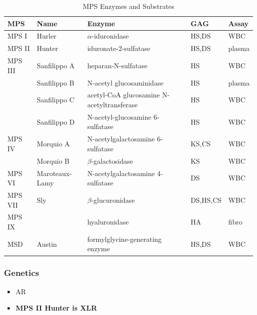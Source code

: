 \documentclass[12pt]{scrartcl}
\begin{document}
\begin{table}[htbp]
\caption[Mucopolysaccharidoses]{\label{tab:org027fa45}MPS Enzymes and Substrates}
\centering
\begin{tabular}{lllll}
MPS & Name & Enzyme & GAG & Assay\\
\hline
MPS I & Hurler & \(\alpha\)-iduronidase & HS,DS & WBC\\
\hline
MPS II & Hunter & iduronate-2-sulfatase & HS,DS & plasma\\
\hline
MPS III & Sanfilippo A & heparan-N-sulfatase & HS & WBC\\
 & Sanfilippo B & N-acetyl glucosaminidase & HS & plasma\\
 & Sanfilippo C & \tiny{acetyl-CoA glucosamine N-acetyltransferase} & HS & WBC\\
 & Sanfilippo D & N-acetyl-glucosamine 6-sulfatase & HS & WBC\\
\hline
MPS IV & Morquio A & N-acetylgalactosamine 6-sulfatase & KS,CS & WBC\\
 & Morquio B & \(\beta\)-galactosidase & KS & WBC\\
\hline
MPS VI & Maroteaux-Lamy & N-acetylgalactosamine 4-sulfatase & DS & WBC\\
MPS VII & Sly & \(\beta\)-glucuronidase & DS,HS,CS & WBC\\
MPS IX &  & hyaluronidase & HA & fibro\\
MSD & Austin & formylglycine-generating enzyme & HS,DS & WBC\\
\end{tabular}
\end{table}

\subsubsection{Genetics}
\label{sec:org1889bfc}
\begin{itemize}
\item AR
\item \textbf{MPS II Hunter is XLR}
\end{itemize}
\end{document}
